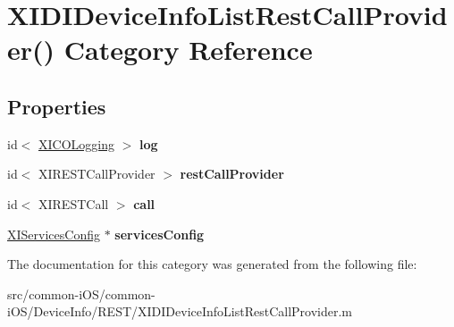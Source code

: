 \hypertarget{category_x_i_d_i_device_info_list_rest_call_provider_07_08}{}\section{X\+I\+D\+I\+Device\+Info\+List\+Rest\+Call\+Provider() Category Reference}
\label{category_x_i_d_i_device_info_list_rest_call_provider_07_08}
\subsection*{Properties}
\begin{DoxyCompactItemize}
\item 
\hypertarget{category_x_i_d_i_device_info_list_rest_call_provider_07_08_a112ee37009d40ac85502a024cead794d}{}\label{category_x_i_d_i_device_info_list_rest_call_provider_07_08_a112ee37009d40ac85502a024cead794d} 
id$<$ \hyperlink{protocol_x_i_c_o_logging-p}{X\+I\+C\+O\+Logging} $>$ {\bfseries log}
\item 
\hypertarget{category_x_i_d_i_device_info_list_rest_call_provider_07_08_aa3dc344bec06d2323b333714f607cf18}{}\label{category_x_i_d_i_device_info_list_rest_call_provider_07_08_aa3dc344bec06d2323b333714f607cf18} 
id$<$ X\+I\+R\+E\+S\+T\+Call\+Provider $>$ {\bfseries rest\+Call\+Provider}
\item 
\hypertarget{category_x_i_d_i_device_info_list_rest_call_provider_07_08_a425e8089445d0c3db62ee050b015fcd4}{}\label{category_x_i_d_i_device_info_list_rest_call_provider_07_08_a425e8089445d0c3db62ee050b015fcd4} 
id$<$ X\+I\+R\+E\+S\+T\+Call $>$ {\bfseries call}
\item 
\hypertarget{category_x_i_d_i_device_info_list_rest_call_provider_07_08_a14217aa6993af899141c91b37df8152e}{}\label{category_x_i_d_i_device_info_list_rest_call_provider_07_08_a14217aa6993af899141c91b37df8152e} 
\hyperlink{interface_x_i_services_config}{X\+I\+Services\+Config} $\ast$ {\bfseries services\+Config}
\end{DoxyCompactItemize}


The documentation for this category was generated from the following file\+:\begin{DoxyCompactItemize}
\item 
src/common-\/i\+O\+S/common-\/i\+O\+S/\+Device\+Info/\+R\+E\+S\+T/X\+I\+D\+I\+Device\+Info\+List\+Rest\+Call\+Provider.\+m\end{DoxyCompactItemize}
